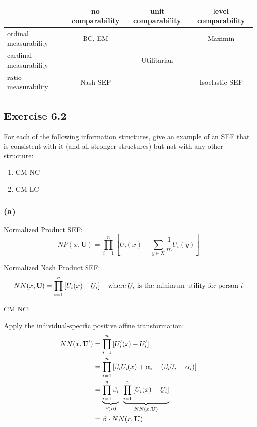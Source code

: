 \documentclass[a4paper]{article}
\newcommand{\ubar}[1]{\underaccent{\bar}{#1}}
\begin{document}
\begin{table}[!htbp]
    \centering
    \begin{tabular}{l|c|c|c|}
                               & no comparability & unit comparability & level comparability \\ 
        \hline
        ordinal measurability  & BC, EM           &                    & Maximin             \\
        \hline
        cardinal measurability &                  & Utilitarian        &                     \\
        \hline
        ratio measurability    & Nash SEF         &                    & Isoelastic SEF      \\
        \hline
    \end{tabular}
\end{table}

\subsection*{Exercise 6.2}

For each of the following information structures, give an example of an SEF that is consistent with it (and all stronger structures) but not with any other structure:
\begin{enumerate}[label=(\alph*)]
    \item CM-NC
    \item CM-LC
\end{enumerate}

\subsubsection*{(a)}

Normalized Product SEF:
\begin{equation*}
    NP(x,\mathbf{U})=\prod_{i=1}^{n}\left[U_i(x)-\sum_{y\in X}\frac{1}{m}U_i(y) \right]
\end{equation*}

Normalized Nash Product SEF:
\begin{equation*}
    NN(x, \mathbf{U})=\prod_{i=1}^{n}\left[U_i(x)-\ubar{U}_i \right]
    \quad\text{where } \ubar{U}_i \text{ is the minimum utility for person }i
\end{equation*}

CM-NC:

Apply the individual-specific positive affine transformation:
\begin{align*}
    NN(x,\mathbf{U}') &= \prod_{i=1}^{n}\left[U_i'(x)-\ubar{U}_i' \right] \\
    &= \prod_{i=1}^{n}\left[\beta_i U_i(x)+\alpha_i-(\beta_i\ubar{U}_i+\alpha_i) \right] \\
    &= \underbrace{\prod_{i=1}^{n}\beta_i}_{\beta>0} \cdot 
    \underbrace{\prod_{i=1}^{n}\left[U_i(x)-\ubar{U}_i\right]}_{NN(x,\mathbf{U})} \\
    &= \beta\cdot NN(x,\mathbf{U})
\end{align*}
\end{document}

